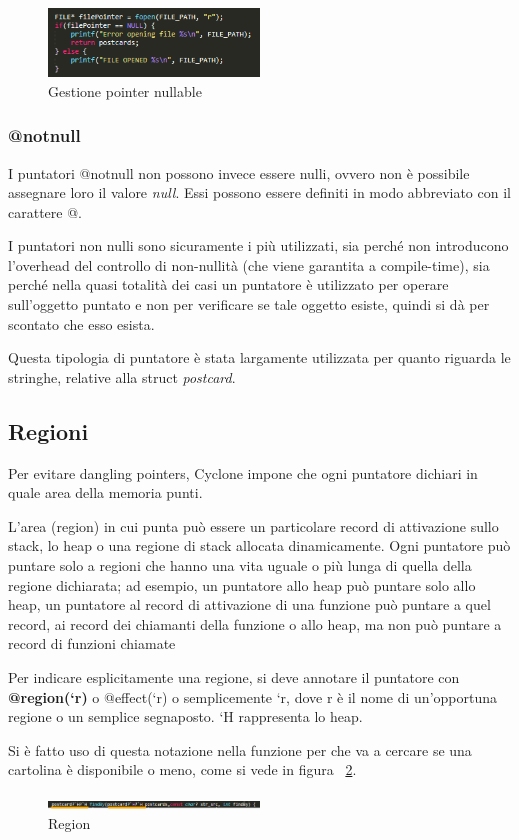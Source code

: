 \begin{figure}[h]
	\centering
	\includegraphics[width=0.5\textwidth]{Immagini/NullablePointerFile.png}
	\caption{Gestione pointer nullable}
	\label{fig:nullable}
\end{figure}

\subsubsection{@notnull}
I puntatori @notnull non possono invece essere nulli, ovvero non è possibile assegnare loro il
valore \textit{null}.
Essi possono essere definiti in modo abbreviato con il carattere @.

I puntatori non nulli sono sicuramente i più utilizzati, sia perché non introducono l’overhead
del controllo di non-nullità (che viene garantita a compile-time), sia perché nella quasi totalità
dei casi un puntatore è utilizzato per operare sull’oggetto puntato e non per verificare se tale
oggetto esiste, quindi si dà per scontato che esso esista.

Questa tipologia di puntatore è stata largamente utilizzata per quanto riguarda le stringhe, relative alla struct \textit{postcard}.

\subsection{Regioni}
\label{sec:regions}
Per evitare dangling pointers, Cyclone impone che ogni puntatore dichiari in quale area della
memoria punti. 

L’area (region) in cui punta può essere un particolare record di attivazione sullo stack, lo heap o una regione di stack allocata dinamicamente. Ogni puntatore può puntare solo a regioni che hanno una vita uguale o più lunga di quella della regione dichiarata; ad
esempio, un puntatore allo heap può puntare solo allo heap, un puntatore al record di
attivazione di una funzione può puntare a quel record, ai record dei chiamanti della funzione o
allo heap, ma non può puntare a record di funzioni chiamate

Per indicare esplicitamente una regione, si deve annotare il puntatore con \textbf{@region(`r)} o
@effect(`r) o semplicemente `r, dove r è il nome di un’opportuna regione o un semplice
segnaposto. `H rappresenta lo heap.

Si è fatto uso di questa notazione nella funzione per che va a cercare se una cartolina è disponibile o meno, come si vede in figura ~\ref{fig:region}.

\begin{figure}[h]
	\centering
	\includegraphics[width=0.5\textwidth]{Immagini/CycRegion.png}
	\caption{Region}
	\label{fig:region}
\end{figure}